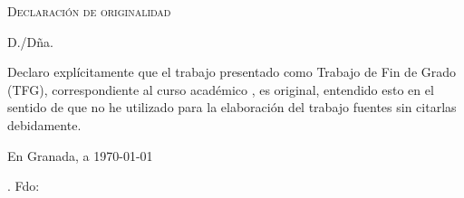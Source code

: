%

\thispagestyle{empty}

\hfill\vfill

\textsc{Declaración de originalidad}\\\bigskip

D./Dña. \miNombre \\\medskip

Declaro explícitamente que el trabajo presentado como Trabajo de Fin de Grado (TFG), correspondiente al curso académico \miCurso, es original, entendido esto en el sentido de que no he utilizado para la elaboración del trabajo fuentes sin citarlas debidamente.
\medskip

En Granada, a \today 
\vspace{3cm}
\begin{center}.
Fdo: \miNombre 

\end{center}

\vfill

\cleardoublepage
\endinput
